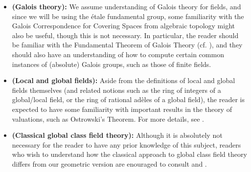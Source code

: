         \begin{convention} \label{conv: number_theory}
            \noindent
            \begin{itemize}
                \item \textbf{(Galois theory):} We assume understanding of Galois theory for fields, and since we will be using the \'etale fundamental group, some familiarity with the Galois Correspondence for Covering Spaces from algebraic topology might also be useful, though this is not necessary. In particular, the reader should be familiar with the Fundamental Theorem of Galois Theory (cf. \cite[\href{https://stacks.math.columbia.edu/tag/0BML}{Tag 0BML}]{stacks}), and they should also have an understanding of how to compute certain common instances of (absolute) Galois groups, such as those of finite fields.
                \item \textbf{(Local and global fields):} Aside from the definitions of local and global fields themselves (and related notions such as the ring of integers of a global/local field, or the ring of rational ad\`eles of a global field), the reader is expected to have some familiarity with important results in the theory of valuations, such as Ostrowski's Theorem. For more details, see \cite[Chapter II]{neukirch_2010_algebraic_number_theory}.
                \item \textbf{(Classical global class field theory):} Although it is absolutely not necessary for the reader to have any prior knowledge of this subject, readers who wish to understand how the classical approach to global class field theory differs from our geometric version are enouraged to consult \cite[Chapters IV and VI]{neukirch_2010_algebraic_number_theory} and \cite[Chapters III, VIII, and IX]{neukirch_1999_cohomology_of_number_field}.
            \end{itemize}
        \end{convention}